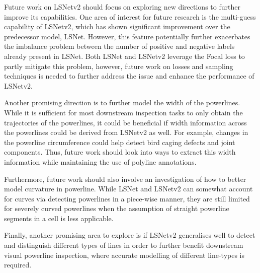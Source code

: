 \documentclass[journal]{IEEEtran}
\begin{document}
Future work on LSNetv2 should focus on exploring new directions to further improve its capabilities. One area of interest for future research is the multi-guess capability of LSNetv2, which has shown significant improvement over the predecessor model, LSNet. However, this feature potentially further exacerbates the imbalance problem between the number of positive and negative labels already present in LSNet. Both LSNet and LSNetv2 leverage the Focal loss to partly mitigate this problem, however, future work on losses and sampling techniques is needed to further address the issue and enhance the performance of LSNetv2.

Another promising direction is to further model the width of the powerlines. While it is sufficient for most downstream inspection tasks to only obtain the trajectories of the powerlines, it could be beneficial if width information across the powerlines could be derived from LSNetv2 as well. For example, changes in the powerline circumference could help detect bird caging defects and joint components. Thus, future work should look into ways to extract this width information while maintaining the use of polyline annotations.

Furthermore, future work should also involve an investigation of how to better model curvature in powerline. While LSNet and LSNetv2 can somewhat account for curves via detecting powerlines in a piece-wise manner, they are still limited for severely curved powerlines when the assumption of straight powerline segments in a cell is less applicable.

Finally, another promising area to explore is if LSNetv2 generalises well to detect and distinguish different types of lines in order to further benefit downstream visual powerline inspection, where accurate modelling of different line-types is required.
\end{document}
